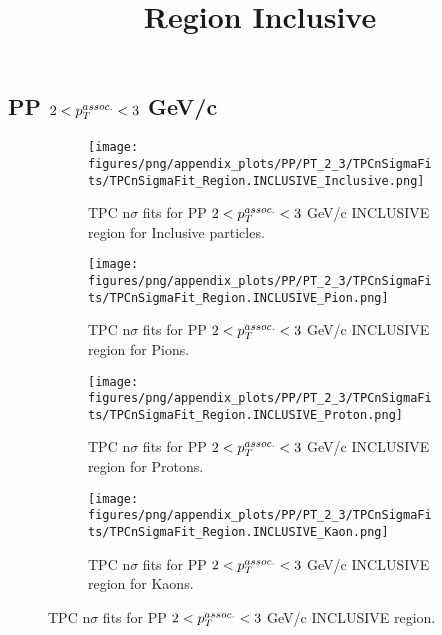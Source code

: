     
            \subsection{PP $2 < \pTassoc < 3$ GeV/c}
            \begin{figure}[H]
                \title{Region Inclusive}
                \begin{subfigure}[b]{0.5\textwidth}
                    \centering
                    \texttt{[image: figures/png/appendix\_plots/PP/PT\_2\_3/TPCnSigmaFits/TPCnSigmaFit\_Region.INCLUSIVE\_Inclusive.png]}
                    \caption{TPC n$\sigma$ fits for PP $2 < \pTassoc < 3$ GeV/c INCLUSIVE region for Inclusive particles.}
                    \label{fig:appendix_PP_$2 < \pTassoc < 3$ GeV/c_INCLUSIVE_Inclusive}
                \end{subfigure}
                \begin{subfigure}[b]{0.5\textwidth}
                    \centering
                    \texttt{[image: figures/png/appendix\_plots/PP/PT\_2\_3/TPCnSigmaFits/TPCnSigmaFit\_Region.INCLUSIVE\_Pion.png]}
                    \caption{TPC n$\sigma$ fits for PP $2 < \pTassoc < 3$ GeV/c INCLUSIVE region for Pions.}
                    \label{fig:appendix_PP_$2 < \pTassoc < 3$ GeV/c_INCLUSIVE_Pion}
                \end{subfigure}
                \begin{subfigure}[b]{0.5\textwidth}
                    \centering
                    \texttt{[image: figures/png/appendix\_plots/PP/PT\_2\_3/TPCnSigmaFits/TPCnSigmaFit\_Region.INCLUSIVE\_Proton.png]}
                    \caption{TPC n$\sigma$ fits for PP $2 < \pTassoc < 3$ GeV/c INCLUSIVE region for Protons.}
                    \label{fig:appendix_PP_$2 < \pTassoc < 3$ GeV/c_INCLUSIVE_Proton}
                \end{subfigure}
                \begin{subfigure}[b]{0.5\textwidth}
                    \centering
                    \texttt{[image: figures/png/appendix\_plots/PP/PT\_2\_3/TPCnSigmaFits/TPCnSigmaFit\_Region.INCLUSIVE\_Kaon.png]}
                    \caption{TPC n$\sigma$ fits for PP $2 < \pTassoc < 3$ GeV/c INCLUSIVE region for Kaons.}
                    \label{fig:appendix_PP_$2 < \pTassoc < 3$ GeV/c_INCLUSIVE_Kaon}
                \end{subfigure}
                \caption{TPC n$\sigma$ fits for PP $2 < \pTassoc < 3$ GeV/c INCLUSIVE region.}
                \label{fig:appendix_PP_$2 < \pTassoc < 3$ GeV/c_INCLUSIVE}
            \end{figure}
